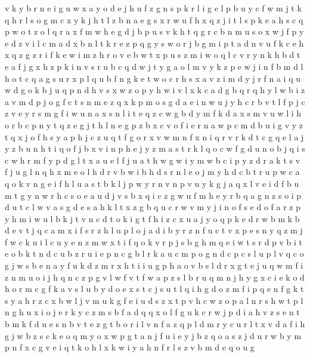 \documentclass{article}
\begin{document}
v k
y b r n e i g u w x
a
y o d e j h u f z g n s p k r
l i
g e l p b u y c f w m j t k q h
r l s o g m c x
y k j h t l z b n a e g s
x
r w u f h x q z j i t l s p k e a
h s c q p w o
t z o l q r a x f m w h e g d j b p u s v k
h t q g r c b n m u s o x w j f p y e d z v i l
c m a d x b n l t k r e z p q g
y s w o r j b g m i p t a d n v u f k c e h x q z
g z r i f
k
e
w i m
z h r o v e b w t
x p u s z m i w o q l c v r y n k h b d t e a f j g
x h z p k i n v s r u b c q d w j t y g a o l m
v y k z p e w j i n f b m d l h o t c q a g s u r x
p l q u b f n g k e t w o c r h s x a v z i m d y j
r f n a i q u w d g o k b
j u q p n d h v s x w
z o p y h w i v l x k c a d g b q
r q h y l w b i z a v m d p j o g f c t s
n m e
z q x k p m o s g d a e i n w u j y h c r b v t l
f
p j c z v e y r s m g f i w u n
a x s n l i t e q z c w g b d y m
f k d a x s m v u w l i h o r b c p n y t q z e g j
t h l n e g p z b x c v o f i
e r n a w p c m d b u i g v y z t q x j o f h s
y a p h j c z u q t f g o r x v w m n
f x n i q r
v r k d t c g q e l a j y z
b u n h
t i q o f j
b x v i n p h e j y z m a s t r k l q o c w f g d u
n o b j q i s c w h r m f y p d g l t x a u e
l f j u a t h w g
w i y
m
w b c i p y z d r a k t s v f j u g l n q h x m e o
l h d r v b
w i b h d s r n l e o j
m y h d c b t
r u p w c a q o k v n g e i f h l
u a s t b k l j p w y r n v
n p v u y k g
j
a q x l v e i d f b u m t g y n w r h c s o
e a u d j v s b x q i c z
g w
u
f m h e y r b q a g n z s o i p d u t c l w
v a s g
d e s a h k l t x z g b q u c r w v m y j i n o f
s e d o f a r z p y h m i w u l b k j t v n c
d t o k i
g t f h i z c x u a j y o q p k e d r w b m
k b d e v t j q c a m x i f s r z h l u p
l o j a d i b y r z n f u c t v x p e s
n y q z m j f w c k u i
l c u y e n z m w x t i f q o k v r p j s b g h
m q
e i w t
s r d p v b i t
e o b k t
n d c u b z
r u i
e p n
c g b l r k a u
c
m p o g n d c
p c s l u
p l v q c o g j w s b e n a y f u k d z m r x h t i
i u g
p h a o v b s l d r x g t e j u q w m f i z n
m u o i j h q n c z p g v l w f
v t f w a p z s l b r u q m n j h y g x c i e k o d
h o
r m c g f k a v s l u b y d o e x
s t c
j s u t l q i h g d o z m f
i p q e n f g k t s y a h r z c x b w l j v m u
k g f e i u d s z x t p v h c w
z o p a l n r s h
w t p l n g h u x i o j e r k y c z m s b f a d q
q x o l f g u k c r w j p d i a h v z s e n t b
m k f d u e s n b v t
e z g t b o r i l v n
f a z
q p l d m r y c
u r l t x v d a f i h g j w b z s c k e o q m y
o x w p g t a n j f u i
e y j b z q o
a s z j d u r w b y m p n f x c g v e i q t k o h l
x k w i y a h n f r l s z v b m d e q o u g
\end{document}
